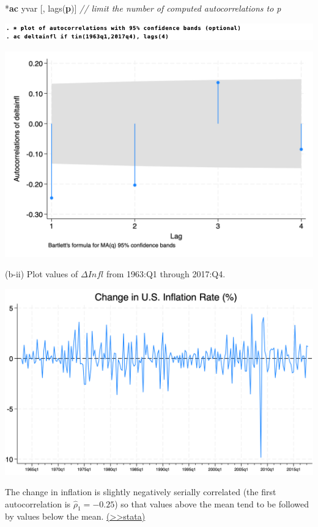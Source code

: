 \documentclass[
  10pt,
  ignorenonframetext,
]{beamer}
\newenvironment{Shaded}{\begin{snugshade}}{\end{snugshade}}
\newcommand{\CommentTok}[1]{\textcolor[rgb]{0.56,0.35,0.01}{\textit{#1}}}
\newcommand{\KeywordTok}[1]{\textcolor[rgb]{0.13,0.29,0.53}{\textbf{#1}}}
\newcommand{\NormalTok}[1]{#1}
\begin{document}
\begin{frame}[fragile]{}
\protect\hypertarget{section}{}
\small

\begin{Shaded}
\begin{Highlighting}[]
\NormalTok{*}\KeywordTok{ac}\NormalTok{ yvar [, lags(}\KeywordTok{p}\NormalTok{)]}
\CommentTok{// limit the number of computed autocorrelations to p}
\end{Highlighting}
\end{Shaded}

\begin{flushleft}\includegraphics[width=1\linewidth]{pictures/(b-i)ac} \end{flushleft}

\begin{center}\includegraphics[width=0.7\linewidth]{pictures/AutocorrelationGraph} \end{center}
\end{frame}

\begin{frame}{(b-ii) Plot values of \(\Delta Infl\) from 1963:Q1 through
2017:Q4.}
\protect\hypertarget{Plot-deltainfl-A}{}
\begin{center}\includegraphics[width=0.85\linewidth]{pictures/Fig2-ChangeInflationRate} \end{center}

\footnotesize The change in inflation is slightly negatively serially
correlated (the first autocorrelation is \(\hat\rho_1 = -0.25\)) so that
values above the mean tend to be followed by values below the mean.
\footnotesize \protect\hyperlink{Plot-deltainfl}{(\textgreater\textgreater stata)}
\end{frame}
\end{document}
